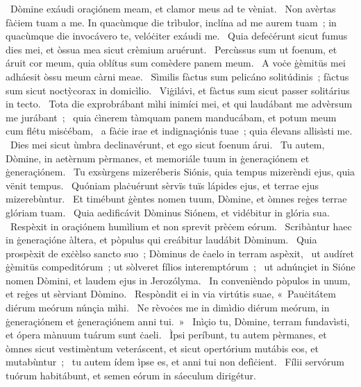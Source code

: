 ~Dòmine exáudi oraçiónem meam, et clamor meus ad te vèniat. 
~Non avèrtas fàċiem tuam a me. In quacùmque die trìbulor, inclína ad me aurem tuam~; in quacùmque die invocávero te, velóċiter exáudi me. 
~Quia defeċérunt sicut fumus dies mei, et òssua mea sicut crèmium aruérunt. 
~Percùssus sum ut foenum, et áruit cor meum, quia oblítus sum comèdere panem meum. 
~A voċe ġèmitüs mei adháesit òssu meum càrni meae. 
~Sìmilis fàctus sum pelicáno solitúdinis~; fàctus sum sicut noctỳcorax in domicìlio. 
~Viġilávi, et fàctus sum sicut passer solitárius in tecto. 
~Tota die exprobrábant mìhi inimíci mei, et qui laudábant me advèrsum me jurábant~; 
~quia ċìnerem tàmquam panem manducábam, et potum meum cum flétu misċébam, 
~a fàċie irae et indignaçiónis tuae~; quia élevans allisìsti me. 
~Dies mei sicut ùmbra declinavérunt, et ego sicut foenum árui. 
~Tu autem, Dòmine, in aetèrnum pèrmanes, et memoriále tuum in ġeneraçiónem et ġeneraçiónem. 
~Tu exsùrgens mizeréberis Siónis, quia tempus mizerèndi ejus, quia vënit tempus. 
~Quóniam plaċuérunt sèrvïs tuïs lápides ejus, et terrae ejus mizerebùntur. 
~Et timébunt ġèntes nomen tuum, Dòmine, et òmnes reġes terrae glóriam tuam. 
~Quia aedificávit Dòminus Siónem, et vidébitur in glória sua. 
~Respèxit in oraçiónem humìlium et non sprevit prèċem eórum. 
~Scribàntur haec in ġeneraçióne àltera, et pòpulus qui creábitur laudábit Dòminum. 
~Quia prospèxit de exċèlso sancto suo~; Dòminus de ċaelo in terram aspèxit, 
~ut audíret ġèmitüs compeditórum~; ut sòlveret fílios interemptórum~; 
~ut adnúnçiet in Sióne nomen Dòmini, et laudem ejus in Jerozólyma. 
~In convenièndo pòpulos in unum, et reġes ut sèrviant Dòmino. 
~Respòndit ei in via virtútis suae, «~Pauċitátem diérum meórum núnçia mìhi.
~Ne rèvoċes me in dimìdio diérum meórum, in ġeneraçiónem et ġeneraçiónem anni tui.~»
~Inìçio tu, Dòmine, terram fundavìsti, et ópera mànuum tuárum sunt ċaeli. 
~Ìpsi períbunt, tu autem pèrmanes, et òmnes sicut vestimèntum veteráscent, et sicut opertórium mutábis eos, et mutabùntur~; 
~tu autem ídem ìpse es, et anni tui non defìċient. 
~Fílii servórum tuórum habitábunt, et semen eórum in sáeculum dirigétur. 
